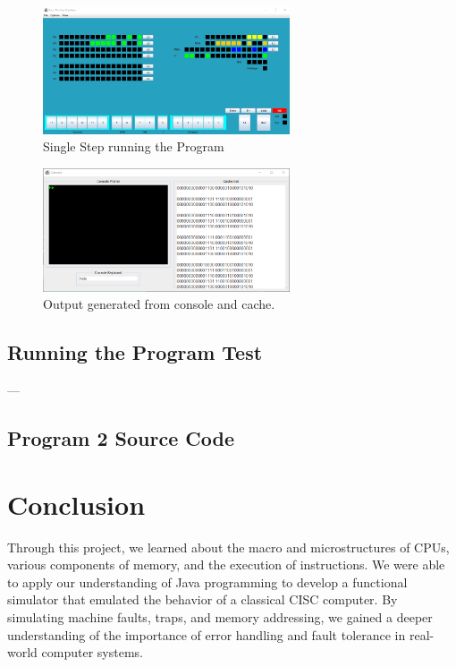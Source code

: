 \documentclass[10pt]{article}
\begin{document}
\begin{enumerate}
\begin{figure}[H]
    \centering
    \includegraphics[width=0.65\textwidth]{Pics/Fig26.png}
    \caption{Single Step running the Program}
    \label{fig:SStep}
  \end{figure}
  \begin{figure}[H]
    \centering
    \includegraphics[width=0.65\textwidth]{Pics/Fig27.png}
    \caption{Output generated from console and cache.}
    \label{fig:Console and Cache Output}
  \end{figure}
\end{enumerate}
\subsection{Running the Program Test}
---
\subsection{Program 2 Source Code}

\section{Conclusion}
Through this project, we learned about the macro and microstructures of CPUs, various 
components of memory, and the execution of instructions. We were able to apply our understanding 
of Java programming to develop a functional simulator that emulated the behavior of a classical 
CISC computer. By simulating machine faults, traps, and memory addressing, we gained a deeper 
understanding of the importance of error handling and fault tolerance in real-world computer systems.
\end{document}

